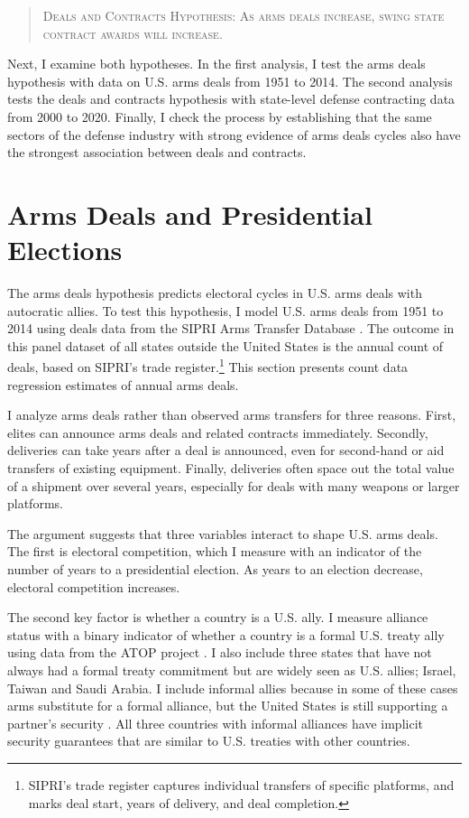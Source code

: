 \documentclass[12pt]{article}
\begin{document}
\begin{quote}
\textsc{Deals and Contracts Hypothesis: As arms deals increase, swing state contract awards will increase.}
\end{quote}


Next, I examine both hypotheses. 
In the first analysis, I test the arms deals hypothesis with data on U.S. arms deals from 1951 to 2014.  
The second analysis tests the deals and contracts hypothesis with state-level defense contracting data from 2000 to 2020. 
Finally, I check the process by establishing that the same sectors of the defense industry with strong evidence of arms deals cycles also have the strongest association between deals and contracts. 


\section{Arms Deals and Presidential Elections}


The arms deals hypothesis predicts electoral cycles in U.S. arms deals with autocratic allies.
To test this hypothesis, I model U.S. arms deals from 1951 to 2014 using deals data from the SIPRI Arms Transfer Database \citep{SIPRI2021}.
The outcome in this panel dataset of all states outside the United States is the annual count of deals, based on SIPRI's trade register.\footnote{SIPRI's trade register captures individual transfers of specific platforms, and marks deal start, years of delivery, and deal completion.}
This section presents count data regression estimates of annual arms deals. 


I analyze arms deals rather than observed arms transfers for three reasons.
First, elites can announce arms deals and related contracts immediately. 
Secondly, deliveries can take years after a deal is announced, even for second-hand or aid transfers of existing equipment. 
Finally, deliveries often space out the total value of a shipment over several years, especially for deals with many weapons or larger platforms. 


The argument suggests that three variables interact to shape U.S. arms deals. 
The first is electoral competition, which I measure with an indicator of the number of years to a presidential election. 
As years to an election decrease, electoral competition increases. 



The second key factor is whether a country is a U.S. ally. 
I measure alliance status with a binary indicator of whether a country is a formal U.S. treaty ally using data from the ATOP project \citep{Leedsetal2002}.
I also include three states that have not always had a formal treaty commitment but are widely seen as U.S. allies; Israel, Taiwan and Saudi Arabia. 
I include informal allies because in some of these cases arms substitute for a formal alliance, but the United States is still supporting a partner's security \citep{Yarhi-Miloetal2016}. 
All three countries with informal alliances have implicit security guarantees that are similar to U.S. treaties with other countries. 
\end{document}
